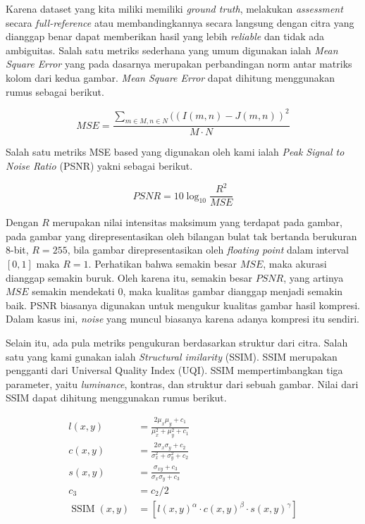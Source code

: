 \documentclass[11pt, a4paper, final]{report}
\begin{document}
Karena dataset yang kita miliki memiliki \textit{ground truth}, melakukan \textit{assessment} secara \textit{full-reference} atau membandingkannya secara langsung dengan citra yang dianggap benar dapat memberikan hasil yang lebih \textit{reliable} dan tidak ada ambiguitas. Salah satu metriks sederhana yang umum digunakan ialah \textit{Mean Square Error} yang pada dasarnya merupakan perbandingan norm antar matriks kolom dari kedua gambar. \textit{Mean Square Error} dapat dihitung menggunakan rumus sebagai berikut.

$$
MSE = \frac{\sum_{m \in M, n \in N}((I(m, n) - J(m, n))^2}{M \cdot N}
$$

Salah satu metriks MSE based yang digunakan oleh kami ialah \textit{Peak Signal to Noise Ratio} (PSNR) yakni sebagai berikut.

$$
PSNR = 10 \log_{10} \frac{R^2}{MSE}
$$

Dengan $R$ merupakan nilai intensitas maksimum yang terdapat pada gambar, pada gambar yang direpresentasikan oleh bilangan bulat tak bertanda berukuran 8-bit, $R = 255$, bila gambar direpresentasikan oleh \textit{floating point} dalam interval $[0, 1]$ maka $R = 1$. Perhatikan bahwa semakin besar $MSE$, maka akurasi dianggap semakin buruk. Oleh karena itu, semakin besar $PSNR$, yang artinya $MSE$ semakin mendekati $0$, maka kualitas gambar dianggap menjadi semakin baik. PSNR biasanya digunakan untuk mengukur kualitas gambar hasil kompresi. Dalam kasus ini, \textit{noise} yang muncul biasanya karena adanya kompresi itu sendiri.

Selain itu, ada pula metriks pengukuran berdasarkan struktur dari citra. Salah satu yang kami gunakan ialah \textit{Structural imilarity} (SSIM). SSIM merupakan pengganti dari Universal Quality Index (UQI). SSIM mempertimbangkan tiga parameter, yaitu \textit{luminance}, kontras, dan struktur dari sebuah gambar. Nilai dari SSIM dapat dihitung menggunakan rumus berikut.

$$
\begin{aligned}
l(x, y)&=\frac{2 \mu_{x} \mu_{y}+c_{1}}{\mu_{x}^{2}+\mu_{y}^{2}+c_{1}} \\
c(x, y)&=\frac{2 \sigma_{x} \sigma_{y}+c_{2}}{\sigma_{x}^{2}+\sigma_{y}^{2}+c_{2}} \\
s(x, y)&=\frac{\sigma_{x y}+c_{3}}{\sigma_{x} \sigma_{y}+c_{3}} \\
c_{3}&=c_{2} / 2 \\
\operatorname{SSIM}(x, y)&=\left[l(x, y)^{\alpha} \cdot c(x, y)^{\beta} \cdot s(x, y)^{\gamma}\right]
\end{aligned}
$$
\end{document}
